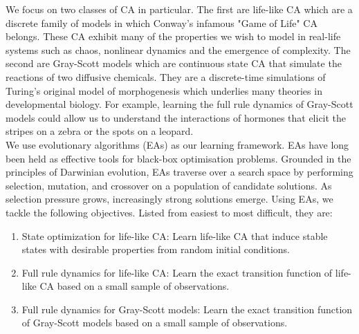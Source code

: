 We focus on two classes of CA in particular. The first are life-like CA which are a discrete family of models in which Conway's infamous "Game of Life" CA belongs. These CA exhibit many of the properties we wish to model in real-life systems such as chaos, nonlinear dynamics and the emergence of complexity. The second are Gray-Scott models which are continuous state CA that simulate the reactions of two diffusive chemicals. They are a discrete-time simulations of Turing's original model of morphogenesis which underlies many theories in developmental biology. For example, learning the full rule dynamics of Gray-Scott models could allow us to understand the interactions of hormones that elicit the stripes on a zebra or the spots on a leopard.\\

We use evolutionary algorithms (EAs) as our learning framework. EAs have long been held as effective tools for black-box optimisation problems. Grounded in the principles of Darwinian evolution, EAs traverse over a search space by performing selection, mutation, and crossover on a population of candidate solutions. As selection pressure grows, increasingly strong solutions emerge. Using EAs, we tackle the following objectives. Listed from easiest to most difficult, they are:

\begin{enumerate}
    \item State optimization for life-like CA: Learn life-like CA that induce stable states with desirable properties from random initial conditions.
    \item Full rule dynamics for life-like CA: Learn the exact transition function of life-like CA based on a small sample of observations.
    \item Full rule dynamics for Gray-Scott models: Learn the exact transition function of Gray-Scott models based on a small sample of observations.
\end{enumerate}

